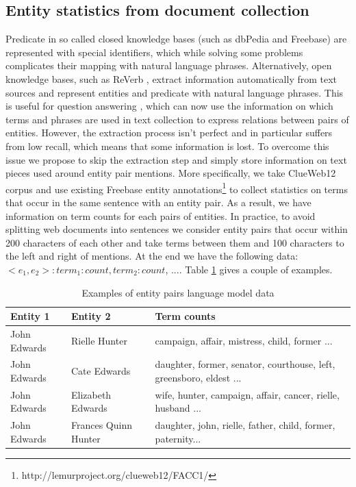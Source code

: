 \subsection{Entity statistics from document collection}
\label{section:method:clueweb}

Predicate in so called closed knowledge bases (such as dbPedia and Freebase) are represented with special identifiers, which while solving some problems complicates their mapping with natural language phrases.
Alternatively, open knowledge bases, such as ReVerb \cite{fader2011identifying}, extract information automatically from text sources and represent entities and predicate with natural language phrases.
This is useful for question answering \cite{Fader:2014:OQA:2623330.2623677}, which can now use the information on which terms and phrases are used in text collection to express relations between pairs of entities.
However, the extraction process isn't perfect and in particular suffers from low recall, which means that some information is lost.
To overcome this issue we propose to skip the extraction step and simply store information on text pieces used around entity pair mentions.
More specifically, we take ClueWeb12 corpus and use existing Freebase entity annotations\footnote{http://lemurproject.org/clueweb12/FACC1/} to collect statistics on terms that occur in the same sentence with an entity pair.
As a result, we have information on term counts for each pairs of entities.
In practice, to avoid splitting web documents into sentences we consider entity pairs that occur within 200 characters of each other and take terms between them and 100 characters to the left and right of mentions.
At the end we have the following data: $<e_1, e_2>: term_1: count, term_2: count$, ....
Table \ref{table:clueweb_entitypairs_langmodel} gives a couple of examples.

\begin{table}
\caption{Examples of entity pairs language model data}
\label{table:clueweb_entitypairs_langmodel}
\begin{tabular}{| p{1.25cm} | p{1.23cm} | p{4.5cm} |}
\hline
Entity 1 & Entity 2 & Term counts\\
\hline
John Edwards & Rielle Hunter & campaign, affair, mistress, child, former ...\\
\hline
John Edwards & Cate Edwards & daughter, former, senator, courthouse, left, greensboro, eldest ...\\
\hline
John Edwards & Elizabeth Edwards & wife, hunter, campaign, affair, cancer, rielle, husband ...\\
\hline
John Edwards & Frances Quinn Hunter & daughter, john, rielle, father, child, former, paternity...\\
\hline
\end{tabular}
\end{table}

